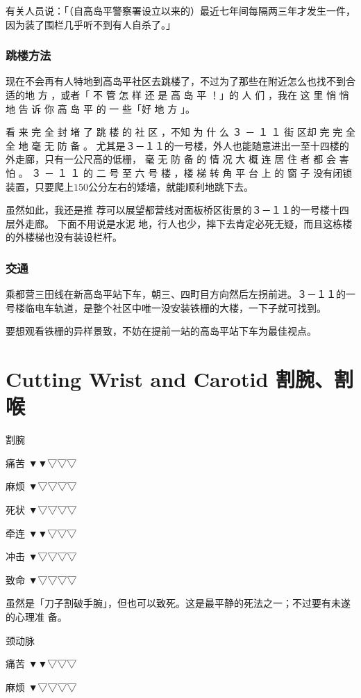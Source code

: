 \documentclass[UTF8]{ctexart}
\begin{document}
有关人员说：「（自高岛平警察署设立以来的）最近七年间每隔两三年才发生一件，因为装了围栏几乎听不到有人自杀了。」

\subsubsection{跳楼方法}

现在不会再有人特地到高岛平社区去跳楼了，不过为了那些在附近怎么也找不到合适的地
方 ，或者「 不 管 怎 样 还 是 高 岛 平 ！」的 人 们 ，我在 这 里 悄 悄 地 告 诉 你 高 岛 平 的 一 些「好 地 方 」。

看 来 完 全 封 堵 了 跳 楼 的 社 区 ，不知 为 什 么 ３ － １ １ 街 区却 完 完 全 全 地 毫 无 防 备 。 
尤其是３－１１的一号楼，外人也能随意进出一至十四楼的外走廊，只有一公尺高的低栅， 毫 无 防 备 的 情 况 大 概 连 居 住 者 都 会 害 怕 。
３ － １ １ 的 二 号  至  六 号 楼 ，楼 梯 转 角 平 台 上 的 窗 子 没有闭锁装置，只要爬上$150$公分左右的矮墙，就能顺利地跳下去。

虽然如此，我还是推 荐可以展望都营线对面板桥区街景的３－１１的一号楼十四层外走廊。
下面不用说是水泥 地，行人也少，摔下去肯定必死无疑，而且这栋楼的外楼梯也没有装设栏杆。

\subsubsection{交通}

乘都营三田线在新高岛平站下车，朝三、四町目方向然后左拐前进。３－１１的一号楼临电车轨道，是整个社区中唯一没安装铁栅的大楼，一下子就可找到。

要想观看铁栅的异样景致，不妨在提前一站的高岛平站下车为最佳视点。

\section{Cutting Wrist and Carotid 割腕、割喉}

割腕

痛苦 ▼▼▽▽▽

麻烦 ▼▽▽▽▽

死状 ▼▽▽▽▽

牵连 ▼▼▽▽▽

冲击 ▼▽▽▽▽

致命 ▼▽▽▽▽

虽然是「刀子割破手腕」，但也可以致死。这是最平静的死法之一；不过要有未遂的心理准
备。

颈动脉

痛苦 ▼▼▽▽▽

麻烦 ▼▽▽▽▽
\end{document}
